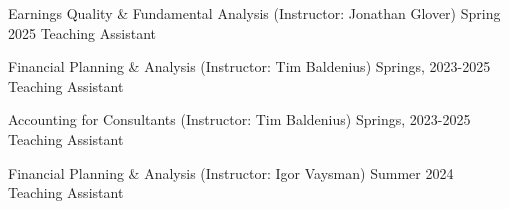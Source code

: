 

\begin{cventries}

\cventrysimple
    {Earnings Quality \& Fundamental Analysis (Instructor: Jonathan Glover)}  %
    {Spring 2025} %
    {Teaching Assistant}
	
\cventrysimple
    {Financial Planning \& Analysis (Instructor: Tim Baldenius)}  %
    {Springs, 2023-2025} %
    {Teaching Assistant}
	
\cventrysimple
	{Accounting for Consultants (Instructor: Tim Baldenius)}  %
    {Springs, 2023-2025} %
    {Teaching Assistant}
    
\cventrysimple
    {Financial Planning \& Analysis (Instructor: Igor Vaysman)}  %
    {Summer 2024} %
    {Teaching Assistant}

\end{cventries}
